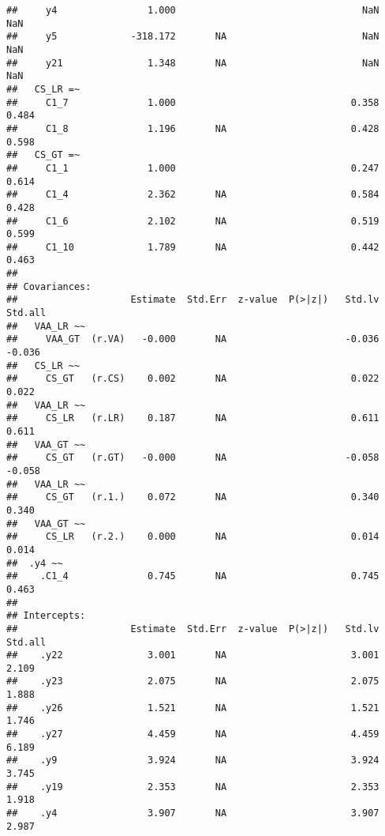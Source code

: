 \documentclass[
]{article}
\begin{document}
\begin{verbatim}
##     y4                1.000                                 NaN      NaN
##     y5             -318.172       NA                        NaN      NaN
##     y21               1.348       NA                        NaN      NaN
##   CS_LR =~                                                              
##     C1_7              1.000                               0.358    0.484
##     C1_8              1.196       NA                      0.428    0.598
##   CS_GT =~                                                              
##     C1_1              1.000                               0.247    0.614
##     C1_4              2.362       NA                      0.584    0.428
##     C1_6              2.102       NA                      0.519    0.599
##     C1_10             1.789       NA                      0.442    0.463
## 
## Covariances:
##                    Estimate  Std.Err  z-value  P(>|z|)   Std.lv  Std.all
##   VAA_LR ~~                                                             
##     VAA_GT  (r.VA)   -0.000       NA                     -0.036   -0.036
##   CS_LR ~~                                                              
##     CS_GT   (r.CS)    0.002       NA                      0.022    0.022
##   VAA_LR ~~                                                             
##     CS_LR   (r.LR)    0.187       NA                      0.611    0.611
##   VAA_GT ~~                                                             
##     CS_GT   (r.GT)   -0.000       NA                     -0.058   -0.058
##   VAA_LR ~~                                                             
##     CS_GT   (r.1.)    0.072       NA                      0.340    0.340
##   VAA_GT ~~                                                             
##     CS_LR   (r.2.)    0.000       NA                      0.014    0.014
##  .y4 ~~                                                                 
##    .C1_4              0.745       NA                      0.745    0.463
## 
## Intercepts:
##                    Estimate  Std.Err  z-value  P(>|z|)   Std.lv  Std.all
##    .y22               3.001       NA                      3.001    2.109
##    .y23               2.075       NA                      2.075    1.888
##    .y26               1.521       NA                      1.521    1.746
##    .y27               4.459       NA                      4.459    6.189
##    .y9                3.924       NA                      3.924    3.745
##    .y19               2.353       NA                      2.353    1.918
##    .y4                3.907       NA                      3.907    2.987

\end{verbatim}
\end{document}
